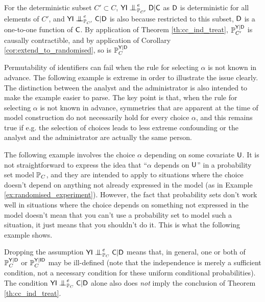 \begin{example}
For the deterministic subset $C'\subset C$, $\RV{YI}\CI^e_{\prob{P}_{C'}} \RV{D}|\RV{C}$ as $\mathsf{D}$ is deterministic for all elements of $C'$, and $\RV{YI}\CI^e_{\prob{P}_{C'}} \RV{C}|\RV{D}$ is also because restricted to this subset, $\mathsf{D}$ is a one-to-one function of $\mathsf{C}$. By application of Theorem \ref{th:cc_ind_treat}, $\mathbb{P}_{C'}^{\mathsf{Y}|\mathsf{D}}$ is causally contractible, and by application of Corollary \ref{cor:extend_to_randomised}, so is $\mathbb{P}_{C}^{\mathsf{Y}|\mathsf{D}}$
\end{example}

Permutability of identifiers can fail when the rule for selecting $\alpha$ is not known in advance. The following example is extreme in order to illustrate the issue clearly. The distinction between the analyst and the administrator is also intended to make the example easier to parse. The key point is that, when the rule for selecting $\alpha$ is not known in advance, symmetries that are apparent at the time of model construction do not necessarily hold for every choice $\alpha$, and this remains true if e.g. the selection of choices leads to less extreme confounding or the analyst and the administrator are actually the same person.

The following example involves the choice $\alpha$ depending on some covariate $\mathsf{U}$. It is not straightforward to express the idea that ``$\alpha$ depends on $\mathsf{U}$'' in a probability set model $\mathbb{P}_C$, and they are intended to apply to situations where the choice doesn't depend on anything not already expressed in the model (as in Example \ref{ex:randomised_experiment}). However, the fact that probability sets don't work well in situations where the choice depends on something not expressed in the model doesn't mean that you can't use a probability set to model such a situation, it just means that you shouldn't do it. This is what the following example shows.

\begin{example}\label{ex:bad_randomised_experiment}

\end{example}




Dropping the assumption $\RV{YI}\CI^e_{\prob{P}_C} \RV{C}|\RV{D}$ means that, in general, one or both of $\mathbb{P}_C^{\mathsf{Y}|\mathsf{D}}$ or $\mathbb{P}_C^{\mathsf{Y}|\mathsf{ID}}$ may be ill-defined (note that the independence is merely a sufficient condition, not a necessary condition for these uniform conditional probabilities). The condition $\RV{YI}\CI^e_{\prob{P}_C} \RV{C}|\RV{D}$ alone also does \emph{not} imply the conclusion of Theorem \ref{th:cc_ind_treat}. 

